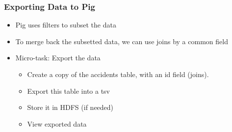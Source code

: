 \documentclass[hyperref={pdfpagelabels=true}]{beamer}
\begin{document}
\begin{frame}
\frametitle{Exporting Data to Pig}
\begin{itemize}
  \item<1->Pig uses filters to subset the data
  \item<1->To merge back the subsetted data, we can use joins by a common field  
  \item<1->Micro-task: Export the data
  \begin{itemize}
    \item<2->Create a copy of the accidents table, with an id field (joins).
    \item<3->Export this table into a tsv
    \item<4->Store it in HDFS (if needed)
    \item<4->View exported data    
  \end{itemize}
\end{itemize}
\end{frame}
\end{document}
